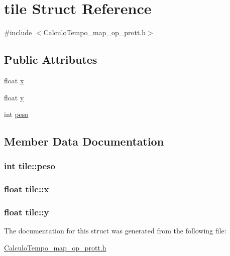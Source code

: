 \hypertarget{structtile}{}\section{tile Struct Reference}
\label{structtile}


{\ttfamily \#include $<$Calculo\+Tempo\+\_\+map\+\_\+op\+\_\+prott.\+h$>$}

\subsection*{Public Attributes}
\begin{DoxyCompactItemize}
\item 
float \hyperlink{structtile_a21e774afeca2be114dbd36c2c13d25ad}{x}
\item 
float \hyperlink{structtile_a7afd4ac6a97bc5d5499d85d7d7c76377}{y}
\item 
int \hyperlink{structtile_a0488f7fad28a756c5d51ab04f7dc0996}{peso}
\end{DoxyCompactItemize}


\subsection{Member Data Documentation}
\subsubsection[{\texorpdfstring{peso}{peso}}]{\setlength{\rightskip}{0pt plus 5cm}int tile\+::peso}\hypertarget{structtile_a0488f7fad28a756c5d51ab04f7dc0996}{}\label{structtile_a0488f7fad28a756c5d51ab04f7dc0996}
\subsubsection[{\texorpdfstring{x}{x}}]{\setlength{\rightskip}{0pt plus 5cm}float tile\+::x}\hypertarget{structtile_a21e774afeca2be114dbd36c2c13d25ad}{}\label{structtile_a21e774afeca2be114dbd36c2c13d25ad}
\subsubsection[{\texorpdfstring{y}{y}}]{\setlength{\rightskip}{0pt plus 5cm}float tile\+::y}\hypertarget{structtile_a7afd4ac6a97bc5d5499d85d7d7c76377}{}\label{structtile_a7afd4ac6a97bc5d5499d85d7d7c76377}


The documentation for this struct was generated from the following file\+:\begin{DoxyCompactItemize}
\item 
\hyperlink{CalculoTempo__map__op__prott_8h}{Calculo\+Tempo\+\_\+map\+\_\+op\+\_\+prott.\+h}\end{DoxyCompactItemize}
